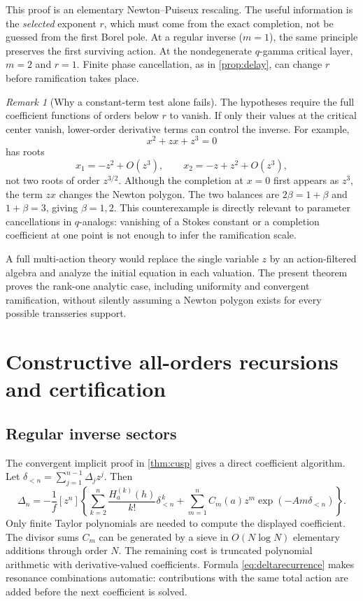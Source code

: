 \documentclass[11pt,a4paper]{article}
\numberwithin{equation}{section}
\theoremstyle{definition}
\theoremstyle{remark}
\newtheorem{remark}[theorem]{Remark}
\begin{document}
This proof is an elementary Newton--Puiseux rescaling. The useful
information is the \emph{selected} exponent $r$, which must come from
the exact completion, not be guessed from the first Borel pole. At a
regular inverse ($m=1$), the same principle preserves the first
surviving action. At the nondegenerate $q$-gamma critical layer,
$m=2$ and $r=1$. Finite phase cancellation, as in
\cref{prop:delay}, can change $r$ before ramification takes place.

\begin{remark}[Why a constant-term test alone fails]
The hypotheses require the full coefficient functions of orders
below $r$ to vanish. If only their values at the critical center
vanish, lower-order derivative terms can control the inverse. For
example,
\begin{equation}
 x^2+zx+z^3=0
 \label{eq:newtoncounter}
\end{equation}
has roots
\[
 x_1=-z^2+O(z^3),\qquad x_2=-z+z^2+O(z^3),
\]
not two roots of order $z^{3/2}$. Although the completion at $x=0$
first appears as $z^3$, the term $zx$ changes the Newton polygon.
The two balances are $2\beta=1+\beta$ and $1+\beta=3$, giving
$\beta=1,2$. This counterexample is directly relevant to parameter
cancellations in $q$-analogs: vanishing of a Stokes constant or a
completion coefficient at one point is not enough to infer the
ramification scale.
\end{remark}

A full multi-action theory would replace the single variable $z$ by
an action-filtered algebra and analyze the initial equation in each
valuation. The present theorem proves the rank-one analytic case,
including uniformity and convergent ramification, without silently
assuming a Newton polygon exists for every possible transseries
support.

\section{Constructive all-orders recursions and certification}
\label{sec:algorithms}

\subsection{Regular inverse sectors}
The convergent implicit proof in \cref{thm:cusp} gives a direct
coefficient algorithm. Let
$\delta_{<n}=\sum_{j=1}^{n-1}\Delta_jz^j$. Then
\begin{equation}
 \Delta_n=-\frac1f[z^n]\left\{
 \sum_{k=2}^{n}\frac{H_a^{(k)}(h)}{k!}\delta_{<n}^{\,k}
 +\sum_{m=1}^{n}C_m(a)z^m\exp(-Am\delta_{<n})\right\}.
 \label{eq:deltarecurrence}
\end{equation}
Only finite Taylor polynomials are needed to compute the displayed
coefficient. The divisor sums $C_m$ can be generated by a sieve in
$O(N\log N)$ elementary additions through order $N$. The remaining
cost is truncated polynomial arithmetic with derivative-valued
coefficients. Formula \eqref{eq:deltarecurrence} makes resonance
combinations automatic: contributions with the same total action are
added before the next coefficient is solved.
\end{document}
